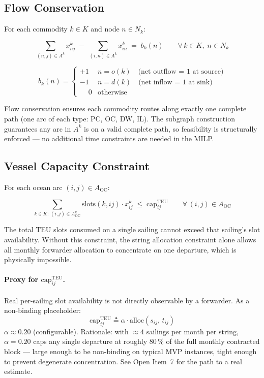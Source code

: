 \documentclass[11pt,a4paper]{article}
\newcommand{\defeq}{\triangleq}
\theoremstyle{definition}
\begin{document}
\subsection{Flow Conservation}

For each commodity $k \in K$ and node $n \in N_k$:

\begin{equation}
  \sum_{(n,j) \in A^k} x_{nj}^k \;-\; \sum_{(i,n) \in A^k} x_{in}^k \;=\; b_k(n)
  \qquad \forall\, k \in K,\; n \in N_k
  \label{eq:flow}
\end{equation}

\[
  b_k(n) = \begin{cases}
    +1 & n = o(k) \quad \text{(net outflow = 1 at source)} \\
    -1 & n = d(k) \quad \text{(net inflow = 1 at sink)} \\
    \phantom{+}0 & \text{otherwise}
  \end{cases}
\]

Flow conservation ensures each commodity routes along exactly one complete path (one arc of
each type: PC, OC, DW, IL). The subgraph construction guarantees any arc in $A^k$ is on a
valid complete path, so feasibility is structurally enforced — no additional time constraints
are needed in the MILP.

\subsection{Vessel Capacity Constraint}

For each ocean arc $(i,j) \in A_{\text{OC}}$:

\begin{equation}
  \sum_{k \in K:\, (i,j) \in A^k_{\text{OC}}} \text{slots}(k,ij) \cdot x_{ij}^k
  \;\leq\; \text{cap}_{ij}^{\text{TEU}}
  \qquad \forall\, (i,j) \in A_{\text{OC}}
  \label{eq:vcap}
\end{equation}

The total TEU slots consumed on a single sailing cannot exceed that sailing's slot
availability. Without this constraint, the string allocation constraint alone allows all
monthly forwarder allocation to concentrate on one departure, which is physically impossible.

\paragraph{Proxy for $\text{cap}_{ij}^{\text{TEU}}$.}
Real per-sailing slot availability is not directly observable by a forwarder. As a
non-binding placeholder:
\[
  \text{cap}_{ij}^{\text{TEU}} \defeq \alpha \cdot \text{alloc}(s_{ij},\, t_{ij})
\]
$\alpha \approx 0.20$ (configurable). Rationale: with $\approx 4$ sailings per month per
string, $\alpha = 0.20$ caps any single departure at roughly 80\,\% of the full monthly
contracted block --- large enough to be non-binding on typical MVP instances, tight enough
to prevent degenerate concentration. See Open Item~7 for the path to a real estimate.
\end{document}
